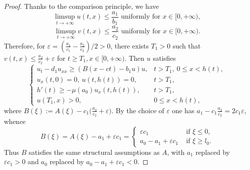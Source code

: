 \documentclass[reqno]{amsart}
\newcommand{\rev}[1]{#1}
\theoremstyle{plain}
\theoremstyle{definition}
\theoremstyle{remark}
\begin{document}
	\begin{proof}
		Thanks to the comparison principle, we have
		\[
		\limsup_{t\to+\infty}u(t,x) \leq \frac{a_1}{b_1}
		\text{ uniformly for } x \in [0,+\infty),
		\]
		\[
		\limsup_{t\to+\infty}v(t,x) \leq \frac{a_2}{c_2}
		\text{ uniformly for } x \in [0,+\infty).
		\]
		Therefore, for $\varepsilon = (\frac{a_1}{c_1} - \frac{a_2}{c_2})/2 > 0$, there
		exists $T_1 > 0$ such that $v(t,x) \leq \frac{a_2}{c_2} + \varepsilon$ for
		$t \geq T_1, x \in [0, +\infty)$. Then $u$ satisfies
		\begin{equation}\label{eq1prospread}
			\begin{cases}
				u_t - d_1u_{xx} \geq (B(x - ct) - b_1u)u,
				& t > T_1,~ 0 \leq x < h(t),\\
				u_x(t,0) = 0,~ u(t, h(t)) = 0,
				& t > T_1,\\
				h'(t) \geq -\mu(a_0)u_x(t,h(t)),
				& t > T_1,\\
				u(T_1,x) > 0,
				& 0 \leq x < h(t),
			\end{cases}
		\end{equation}
		where \rev{$B(\xi) := A(\xi) - c_1\bigl(\frac{a_2}{c_2}+\varepsilon\bigr)$.
		By the choice of $\varepsilon$ one has $a_1-c_1\frac{a_2}{c_2}=2c_1\varepsilon$, whence}
		\[
		B(\xi) \rev{{}= A(\xi) - a_1 + \varepsilon c_1}
		= \begin{cases}
			\varepsilon c_1 & \text{ if } \xi \leq 0,\\
			a_0 - a_1 + \varepsilon c_1      & \text{ if } \xi \geq l_0.
		\end{cases}
		\]
		\rev{Thus $B$ satisfies the same structural assumptions as $A$, with $a_1$
		replaced by $\varepsilon c_1>0$ and $a_0$ replaced by
		$a_0-a_1+\varepsilon c_1<0$.}
		

\end{proof}
\end{document}
